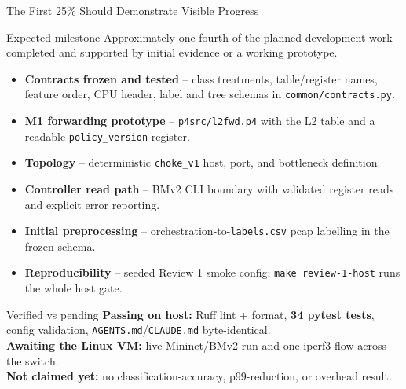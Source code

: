 \documentclass[aspectratio=169,11pt]{beamer}
\begin{document}
\begin{frame}{The First 25\% Should Demonstrate Visible Progress}
  \begin{exampleblock}{Expected milestone}
    Approximately one-fourth of the planned development work completed and supported by initial
    evidence or a working prototype.
  \end{exampleblock}
  \vspace{-0.2em}
  {\footnotesize
  \begin{itemize}
    \item \textbf{Contracts frozen and tested} -- class treatments, table/register names, feature
          order, CPU header, label and tree schemas in \texttt{common/contracts.py}.
    \item \textbf{M1 forwarding prototype} -- \texttt{p4src/l2fwd.p4} with the L2 table and a
          readable \texttt{policy\_version} register.
    \item \textbf{Topology} -- deterministic \texttt{choke\_v1} host, port, and bottleneck
          definition.
    \item \textbf{Controller read path} -- BMv2 CLI boundary with validated register reads and
          explicit error reporting.
    \item \textbf{Initial preprocessing} -- orchestration-to-\texttt{labels.csv} pcap labelling in
          the frozen schema.
    \item \textbf{Reproducibility} -- seeded Review 1 smoke config; \texttt{make review-1-host}
          runs the whole host gate.
  \end{itemize}}
  \vspace{-0.1em}
  \begin{block}{Verified vs pending}
    \footnotesize
    \textbf{Passing on host:} Ruff lint + format, \textbf{34 pytest tests}, config validation,
    \texttt{AGENTS.md}/\texttt{CLAUDE.md} byte-identical. \\
    \textbf{Awaiting the Linux VM:} live Mininet/BMv2 run and one iperf3 flow across the switch. \\
    \textbf{Not claimed yet:} no classification-accuracy, p99-reduction, or overhead result.
  \end{block}
\end{frame}
\end{document}
